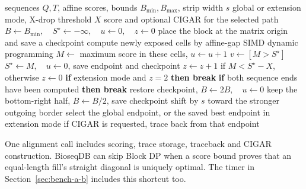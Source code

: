 \begin{algorithm}[H]
\caption{Main decisions of adaptive Block Aligner}
\label{alg:adaptive-block-alignment}
\footnotesize
\begin{algorithmic}[1]
  \Require sequences \(Q,T\), affine scores, bounds \(B_{\min},B_{\max}\), strip width \(s\)
  \Require global or extension mode, X-drop threshold \(X\)
  \Ensure score and optional CIGAR for the selected path
  \State \(B\gets B_{\min},\quad S^\star\gets-\infty,\quad u\gets0,\quad z\gets0\)
  \State place the block at the matrix origin and save a checkpoint
    \State compute newly exposed cells by affine-gap SIMD dynamic programming
    \State \(M\gets\) maximum score in these cells, \(u\gets u+1\)
    \State \(v\gets[M>S^\star]\) 
      \State \(S^\star\gets M,\quad u\gets0\), save endpoint and checkpoint
    \EndIf
    \State \(z\gets z+1\) if \(M<S^\star-X\), otherwise \(z\gets0\)
    \State \textbf{if} extension mode and \(z=2\) \textbf{then break}
    \State \textbf{if} both sequence ends have been computed \textbf{then break}
      \State restore checkpoint, \(B\gets2B,\quad u\gets0\)
    \Else
        \State keep the bottom-right half, \(B\gets B/2\), save checkpoint
      \EndIf
      \State shift by \(s\) toward the stronger outgoing border
    \EndIf
  \EndWhile
  \State select the global endpoint, or the saved best endpoint in extension mode
  \State if CIGAR is requested, trace back from that endpoint
\end{algorithmic}
\end{algorithm}

\noindent\label{sec:final-alignment-fused-work}
One alignment call includes scoring, trace storage, traceback and CIGAR
construction. BioseqDB can skip Block DP when a score bound proves that an
equal-length fill's straight diagonal is uniquely optimal. The timer in
Section~\ref{sec:bench-a-b} includes this shortcut too.

